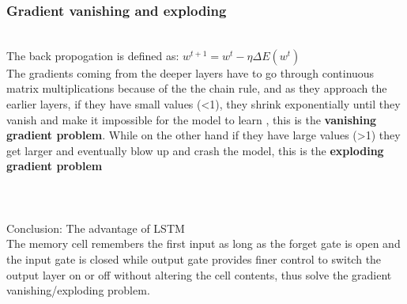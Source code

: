 \documentclass[11pt, a4paper]{article} %
\begin{document}
\subsubsection{Gradient vanishing and exploding}
\\ The back propogation is defined as: $w^{t+1} = w^{t} - \eta\Delta E(w^{t})$ 
\\ The gradients coming from the deeper layers have to go through continuous matrix multiplications because of the the chain rule, and as they approach the earlier layers, if they have small values (<1), they shrink exponentially until they vanish and make it impossible for the model to learn , this is the \textbf{vanishing gradient problem}. While on the other hand if they have large values (>1) they get larger and eventually blow up and crash the model, this is the \textbf{exploding gradient problem}
\\
\\
\\
\\ {\Large Conclusion: The advantage of LSTM}
\\ The memory cell remembers the first input as long as the forget gate is open and the input gate is closed while output gate provides finer control to switch the output layer on or off without altering the cell contents, thus solve the gradient vanishing/exploding problem.
\end{document}

